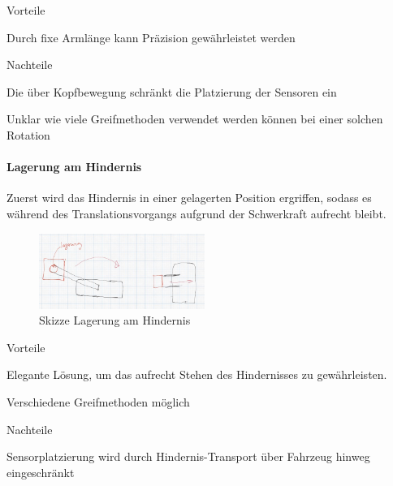 \documentclass[../main.tex]{subfiles}
\begin{document}
\begin{minipage}[t]{0.48\textwidth}
    \begin{items}
          \item [Vorteile]
          \item Durch fixe Armlänge kann Präzision gewährleistet werden
    \end{items}
\end{minipage}
\hfill
\begin{minipage}[t]{0.48\textwidth}
    \begin{items}
          \item [Nachteile]
          \item Die über Kopfbewegung schränkt die Platzierung der Sensoren ein
          \item Unklar wie viele Greifmethoden verwendet werden können bei einer solchen Rotation
    \end{items}
\end{minipage}
\newpage
\paragraph{Lagerung am Hindernis}
Zuerst wird das Hindernis in einer gelagerten Position ergriffen, sodass es während des Translationsvorgangs aufgrund der Schwerkraft aufrecht bleibt.

\begin{figure}[H]
        \centering
        \includegraphics[width=0.48\textwidth]{img/technologierecherche/Rotation/ueberkopf_objekt_gelagert.jpg}
        \caption{Skizze Lagerung am Hindernis} 
        \label{img:tech_ueberkopf_objekt_gelagert}
\end{figure}

\begin{minipage}[t]{0.48\textwidth}
    \begin{items}
          \item [Vorteile]
          \item Elegante Lösung, um das aufrecht Stehen des Hindernisses zu gewährleisten.
          \item Verschiedene Greifmethoden möglich
    \end{items}
\end{minipage}
\hfill
\begin{minipage}[t]{0.48\textwidth}
    \begin{items}
          \item [Nachteile]
          \item Sensorplatzierung wird durch Hindernis-Transport über Fahrzeug hinweg eingeschränkt
          
    \end{items}
\end{minipage}
\newpage
\end{document}
